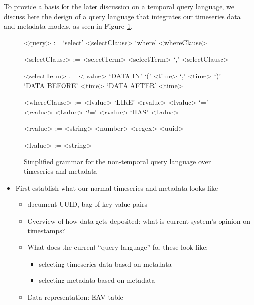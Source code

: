 To provide a basis for the later discussion on a temporal query language, we discuss
here the design of a query language that integrates our timeseries data and metadata
models, as seen in Figure~\ref{fig:nontemporalgrammar}.

\setlength{\grammarindent}{8em}
\setlength{\grammarparsep}{4pt}
\begin{figure}
\centering
\begin{grammar}
<query> := `select' <selectClause> `where' <whereClause>

<selectClause> := <selectTerm>
\alt <selectTerm> `,' <selectClause>

<selectTerm> := <lvalue>
\alt `DATA IN' `(' <time> `,' <time> `)'
\alt `DATA BEFORE' <time>
\alt `DATA AFTER' <time>

<whereClause> := <lvalue> `LIKE' <rvalue>
\alt <lvalue> `=' <rvalue>
\alt <lvalue> `!=' <rvalue>
\alt `HAS' <lvalue>

<rvalue> := <string>
\alt <number>
\alt <regex>
\alt <uuid>

<lvalue> := <string>
\end{grammar}
\caption{Simplified grammar for the non-temporal query language over timeseries and metadata}
\label{fig:nontemporalgrammar}
\end{figure}

\begin{itemize}
\item First establish what our normal timeseries and metadata looks like
  \begin{itemize}
  \item document UUID, bag of key-value pairs
  \item Overview of how data gets deposited: what is current system's opinion on timestamps?
  \item What does the current ``query language'' for these look like:
      \begin{itemize}
      \item selecting timeseries data based on metadata
      \item selecting metadata based on metadata
      \end{itemize}
  \item Data representation: EAV table
  \end{itemize}
\end{itemize}
